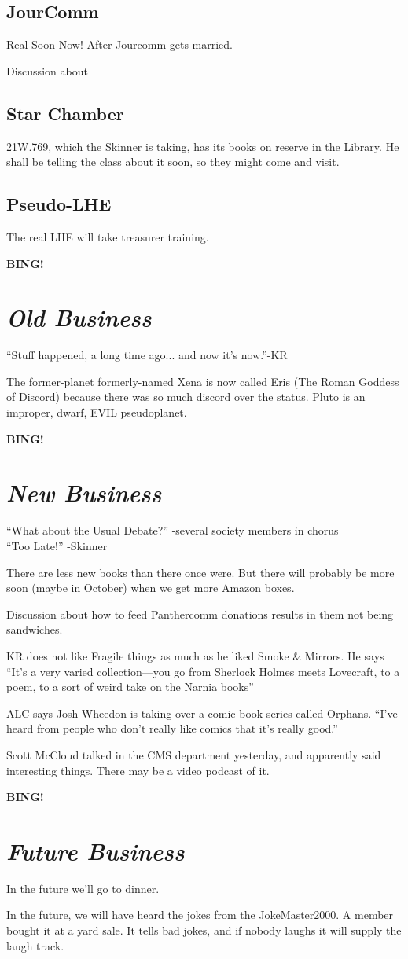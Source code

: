 \documentclass[10pt]{article}
\newcommand{\bing}{{\bf BING!} }
\newcommand{\goto}[1]{\bing \vskip 12pt \section*{{\em{#1}}}}
\begin{document}
\subsection*{JourComm}
Real Soon Now! After Jourcomm gets married.

Discussion about 

\subsection*{Star Chamber}
21W.769, which the Skinner is taking, has its books on reserve in the
Library. He shall be telling the class about it soon, so they might
come and visit.

\subsection{Pseudo-LHE}
The real LHE will take treasurer training.

\goto{Old Business}
``Stuff happened, a long time ago... and now it's now.''-KR

The former-planet formerly-named Xena is now called Eris (The Roman
Goddess of Discord) because there was so much discord over the status.
Pluto is an improper, dwarf, EVIL pseudoplanet.

\goto{New Business}
``What about the Usual Debate?'' -several society members in chorus \\
``Too Late!'' -Skinner

There are less new books than there once were. But there will probably
be more soon (maybe in October) when we get more Amazon boxes.

Discussion about how to feed Panthercomm donations results in them not
being sandwiches.

KR does not like Fragile things as much as he liked Smoke \&
Mirrors. He says ``It's a very varied collection---you go from
Sherlock Holmes meets Lovecraft, to a poem, to a sort of weird take on
the Narnia books'' 

ALC says Josh Wheedon is taking over a comic book series called
Orphans. ``I've heard from people who don't really like comics that
it's really good.''  

Scott McCloud talked in the CMS department yesterday, and apparently
said interesting things. There may be a video podcast of it.

\goto{Future Business}
In the future we'll go to dinner.

In the future, we will have heard the jokes from the JokeMaster2000. A
member bought it at a yard sale.  It tells bad jokes, and if nobody
laughs it will supply the laugh track.
\end{document}
